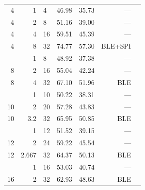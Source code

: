 \begin{table}[htbp]
\begin{tabular}{@{}rrlrrrl@{}}
4 &  1    &  4 & 46.98 & 35.73 & ---     \\
4 &  2    &  8 & 51.16 & 39.00 & ---     \\
4 &  4    & 16 & 59.51 & 45.39 & ---     \\
4 &  8    & 32 & 74.77 & 57.30 & BLE+SPI \\
\addlinespace
8 &  1    &  8 & 48.92 & 37.38 & ---     \\
8 &  2    & 16 & 55.04 & 42.24 & ---     \\
8 &  4    & 32 & 67.10 & 51.96 & BLE     \\
\addlinespace
10 &  1   & 10 & 50.22 & 38.31 & ---     \\
10 &  2   & 20 & 57.28 & 43.83 & ---     \\
10 &  3.2 & 32 & 65.95 & 50.85 & BLE     \\
\addlinespace
12 &  1      & 12 & 51.52 & 39.15 & ---  \\
12 &  2      & 24 & 59.22 & 45.54 & ---  \\
12 &  2.667  & 32 & 64.37 & 50.13 & BLE  \\
\addlinespace
16 &  1   & 16 & 53.03 & 40.74 & ---     \\
16 &  2   & 32 & 62.93 & 48.63 & BLE     \\
\bottomrule
\end{tabular}
\end{table}


